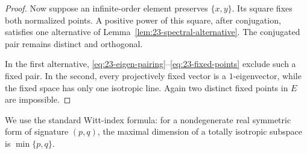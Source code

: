 \documentclass[11pt,reqno]{amsart}
\theoremstyle{plain}
\theoremstyle{definition}
\theoremstyle{remark}
\numberwithin{equation}{section}
\begin{document}
\begin{proof}
Now suppose an infinite-order element preserves $\{x,y\}$. Its square fixes both normalized points. A positive power of this square, after conjugation, satisfies one alternative of Lemma~\ref{lem:23-spectral-alternative}. The conjugated pair remains distinct and orthogonal.

In the first alternative, \eqref{eq:23-eigen-pairing}--\eqref{eq:23-fixed-points} exclude such a fixed pair. In the second, every projectively fixed vector is a $1$-eigenvector, while the fixed space has only one isotropic line. Again two distinct fixed points in $E$ are impossible.
\end{proof}

We use the standard Witt-index formula: for a nondegenerate real symmetric form of signature $(p,q)$, the maximal dimension of a totally isotropic subspace is $\min\{p,q\}$.
\end{document}
